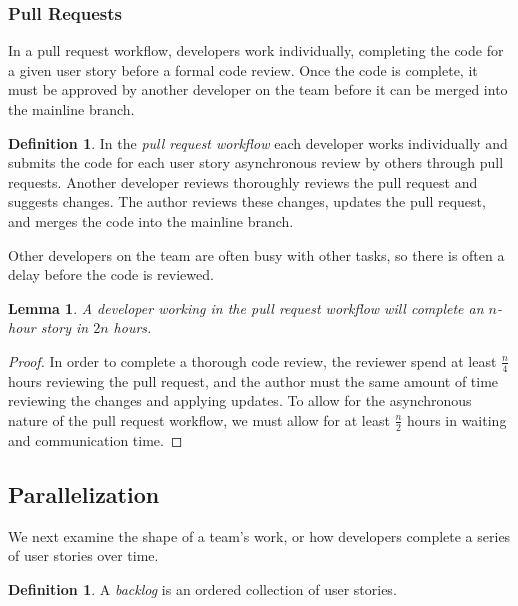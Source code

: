 \documentclass[letterpaper]{article}
\newtheorem{lemma}[theorem]{Lemma}
\theoremstyle{definition}
\newtheorem{definition}[theorem]{Definition}
\begin{document}
    \subsubsection{Pull Requests}\label{subsubsec:pull-requests}

    In a pull request workflow, developers work individually, completing the code for a given user story before a formal
    code review.
    Once the code is complete, it must be approved by another developer on the team before it can be merged into the
    mainline branch.

    \begin{definition}
        In the \textit{pull request workflow} each developer works individually and submits the code for each user story
        asynchronous review by others through pull requests.
        Another developer reviews thoroughly reviews the pull request and suggests changes.
        The author reviews these changes, updates the pull request, and merges the code into the mainline branch.
    \end{definition}

    Other developers on the team are often busy with other tasks, so there is often a delay before the code is reviewed.

    \begin{lemma}
        \label{lemma:solo}
        A developer working in the pull request workflow will complete an $n$-hour story in $2n$ hours.
    \end{lemma}
    \begin{proof}
        In order to complete a thorough code review, the reviewer spend at least $\frac{n}{4}$ hours reviewing the pull
        request, and the author must the same amount of time reviewing the changes and applying updates.
        To allow for the asynchronous nature of the pull request workflow, we must allow for at least $\frac{n}{2}$
        hours in waiting and communication time.
    \end{proof}

    \subsection{Parallelization}\label{subsec:parallelization}

    We next examine the shape of a team's work, or how developers complete a series of user stories over time.

    \begin{definition}
        A \textit{backlog} is an ordered collection of user stories.
    \end{definition}
\end{document}
